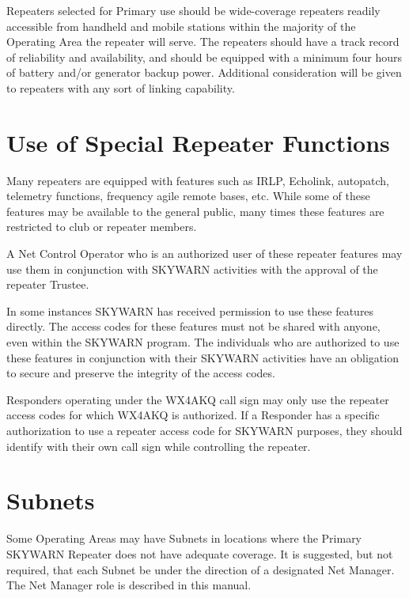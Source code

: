 \documentclass[pdflatex,letterpaper,twoside,12pt]{book}
\begin{document}
Repeaters selected for Primary use should be wide-coverage repeaters readily accessible from handheld and mobile stations within the majority of the Operating Area the repeater will serve.  The repeaters should have a track record of reliability and availability, and should be equipped with a minimum four hours of battery and/or generator backup power.  Additional consideration will be given to repeaters with any sort of linking capability.


\section{Use of Special Repeater Functions}

Many repeaters are equipped with features such as IRLP, Echolink, autopatch, telemetry functions, frequency agile remote bases, etc.  While some of these features may be available to the general public, many times these features are restricted to club or repeater members. 

A Net Control Operator who is an authorized user of these repeater features may use them in conjunction with SKYWARN activities with the approval of the repeater Trustee. 

In some instances SKYWARN has received permission to use these features directly.  The access codes for these features must not be shared with anyone, even within the SKYWARN program.  The individuals who are authorized to use these features in conjunction with their SKYWARN activities have an obligation to secure and preserve the integrity of the access codes. 

Responders operating under the WX4AKQ call sign may only use the repeater access codes for which WX4AKQ is authorized.  If a Responder has a specific authorization to use a repeater access code for SKYWARN purposes, they should identify with their own call sign while controlling the repeater.


\section{Subnets}

Some Operating Areas may have Subnets in locations where the Primary SKYWARN Repeater does not have adequate coverage.  It is suggested, but not required, that each Subnet be under the direction of a designated Net Manager. The Net Manager role is described in this manual. 
\end{document}
